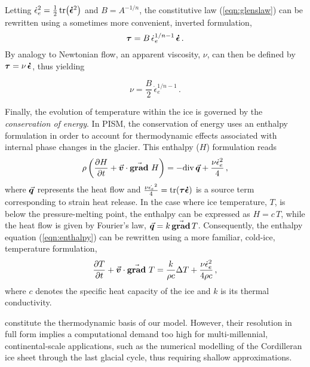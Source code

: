 \documentclass{article}
\newcommand{\vect}[1]{\va*{#1}} %
\newcommand{\tens}[1]{\vb*{#1}} %
\renewcommand{\div}[1]{\mathrm{div}\,#1}            %
\renewcommand{\grad}[1]{\vect{\mathrm{grad}}\,#1}   %
\newcommand{\matdv}[1]{\pdv{#1}{t}+\vect{v}\cdot\grad{}\,#1}  %
\newcommand{\doteps}[0]{\dot{\epsilon}} %
\newcommand{\DST}[0]{\tens{\tau}}       %
\newcommand{\SRT}[0]{\tens{\doteps}}    %
\begin{document}
Letting ${\doteps_e}^2 = \frac{1}{2} \tr(\SRT^2)$ and $B=A^{-1/n}$, the
constitutive law (\ref{eqn:glenslaw}) can be rewritten using a sometimes more
convenient, inverted formulation,
\begin{equation}
    \label{eqn:invglenslaw}
    \DST = B\,\doteps_e^{1/n-1}\,\SRT \,.
\end{equation}
By analogy to Newtonian flow, an apparent viscosity, $\nu$, can then be defined
by $\DST = \nu\,\SRT$, thus yielding

\begin{equation}
    \label{eqn:viscosity}
    \nu = \frac{B}{2}\,\doteps_e^{1/n-1} \,.
\end{equation}

Finally, the evolution of temperature within the ice is governed by the
\emph{conservation of energy}. In PISM, the conservation of energy uses an
enthalpy formulation in order to account for thermodynamic effects associated
with internal phase changes in the glacier. This enthalpy ($H$) formulation
reads
\begin{equation}
    \label{eqn:enthalpy}
    \rho \left(\matdv{H}\right)
        = -\div{\vect{q}} + \frac{\nu\doteps_e^2}{4} \,,
\end{equation}
where $\vect{q}$ represents the heat flow and
${\frac{\nu\dot{\epsilon_e}^2}{4} = \tr(\DST\SRT)}$ is a
source term corresponding to strain heat release. In the case where ice
temperature, $T$, is below the pressure-melting point, the enthalpy can be
expressed as $H=c\,T$, while the heat flow is given by Fourier's law,
$\vect{q} = k\,\grad{T}$. Consequently, the enthalpy equation
(\ref{eqn:enthalpy}) can be rewritten using a more familiar, cold-ice,
temperature formulation,
\begin{equation}
    \label{eqn:temperature}
    \matdv{T} = \frac{k}{\rho c} \Delta T
                + \frac{\nu\doteps_e^2}{4\rho c} \,,
\end{equation}
where $c$ denotes the specific heat capacity of the ice and $k$ is its thermal
conductivity.

constitute the thermodynamic basis
of our model. However, their resolution in full form implies a computational
demand too high for multi-millennial, continental-scale applications, such as
the numerical modelling of the Cordilleran ice sheet through the last glacial
cycle, thus requiring shallow approximations.

\end{document}
